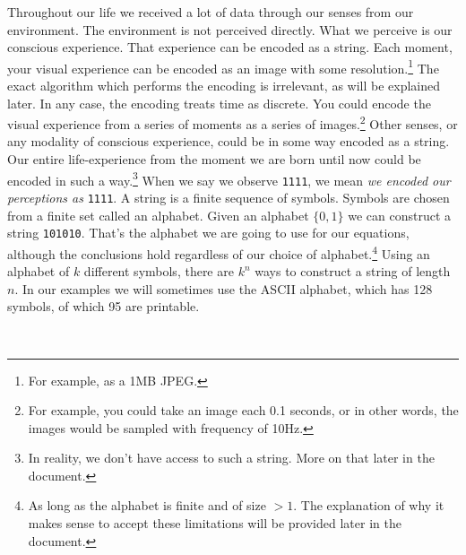 \documentclass[oneside,hidelinks]{article}
\begin{document}
Throughout our life we received a lot of data through our senses from our environment.
The environment is not perceived directly.
What we perceive is our conscious experience.
That experience can be encoded as a string.
Each moment, your visual experience can be encoded as an image with some resolution.\footnote{
For example, as a 1MB JPEG.
}
The exact algorithm which performs the encoding is irrelevant, as will be explained later.
In any case, the encoding treats time as discrete.
You could encode the visual experience from a series of moments as a series of images.\footnote{
For example, you could take an image each 0.1 seconds, or in other words, the images would be sampled with frequency of 10Hz.
}
Other senses, or any modality of conscious experience, could be in some way encoded as a string.
Our entire life-experience from the moment we are born until now could be encoded in such a way.\footnote{
In reality, we don't have access to such a string. More on that later in the document.
}
When we say we observe \texttt{1111}, we mean \textit{we encoded our perceptions as} \texttt{1111}.
A string is a finite sequence of symbols.
Symbols are chosen from a finite set called an alphabet.
Given an alphabet $\{0,1\}$ we can construct a string \texttt{101010}.
That's the alphabet we are going to use for our equations, although the conclusions hold regardless of our choice of alphabet.\footnote{
As long as the alphabet is finite and of size $>1$.
The explanation of why it makes sense to accept these limitations will be provided later in the document.
} %
Using an alphabet of $k$ different symbols, there are $k^n$ ways to construct a string of length $n$.
In our examples we will sometimes use the ASCII alphabet, which has 128 symbols, of which 95 are printable.

\newpage
~
\vspace{30px}

\thispagestyle{empty}

\begin{center}
\end{center}
\end{document}
